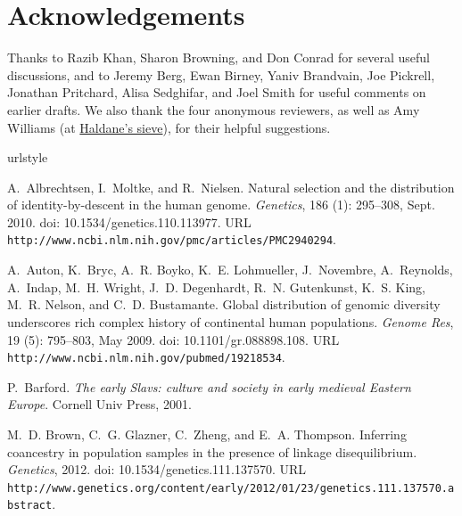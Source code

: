 \documentclass{article}
\begin{document}
\section*{Acknowledgements}
Thanks to Razib Khan, Sharon Browning, and Don Conrad for several useful discussions, 
and to Jeremy Berg, Ewan Birney, Yaniv Brandvain, Joe Pickrell, Jonathan Pritchard, Alisa Sedghifar, and Joel Smith for useful comments on earlier drafts.  
We also thank the four anonymous reviewers, as well as Amy Williams 
(at \href{http://haldanessieve.org/2012/10/05/our-paper-the-geography-of-recent-genetic-ancestry-across-europe/comment-page-1/}{Haldane's sieve}),
for their helpful suggestions.

\appendix


\begin{thebibliography}{76}
\providecommand{\natexlab}[1]{#1}
\providecommand{\url}[1]{\texttt{#1}}
\expandafter\ifx\csname urlstyle\endcsname\relax
  \providecommand{\doi}[1]{doi: #1}\else
  \providecommand{\doi}{doi: \begingroup \urlstyle{rm}\Url}\fi

A.~Albrechtsen, I.~Moltke, and R.~Nielsen.
\newblock Natural selection and the distribution of identity-by-descent in the
  human genome.
\newblock \emph{Genetics}, 186 (1): 295--308, Sept. 2010.
\newblock \doi{10.1534/genetics.110.113977}.
\newblock URL \url{http://www.ncbi.nlm.nih.gov/pmc/articles/PMC2940294}.

A.~Auton, K.~Bryc, A.~R. Boyko, K.~E. Lohmueller, J.~Novembre, A.~Reynolds,
  A.~Indap, M.~H. Wright, J.~D. Degenhardt, R.~N. Gutenkunst, K.~S. King, M.~R.
  Nelson, and C.~D. Bustamante.
\newblock Global distribution of genomic diversity underscores rich complex
  history of continental human populations.
\newblock \emph{Genome Res}, 19 (5): 795--803, May 2009.
\newblock \doi{10.1101/gr.088898.108}.
\newblock URL \url{http://www.ncbi.nlm.nih.gov/pubmed/19218534}.

P.~Barford.
\newblock \emph{The early Slavs: culture and society in early medieval Eastern
  Europe}.
\newblock Cornell Univ Press, 2001.

M.~D. Brown, C.~G. Glazner, C.~Zheng, and E.~A. Thompson.
\newblock Inferring coancestry in population samples in the presence of linkage
  disequilibrium.
\newblock \emph{Genetics}, 2012.
\newblock \doi{10.1534/genetics.111.137570}.
\newblock URL
  \url{http://www.genetics.org/content/early/2012/01/23/genetics.111.137570.abstract}.


\end{thebibliography}
\end{document}
